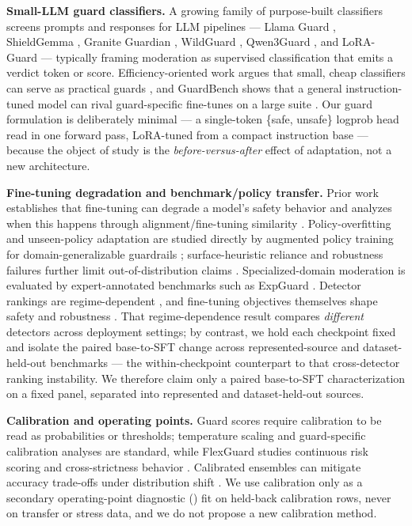 \documentclass[11pt]{article}
\begin{document}
\textbf{Small-LLM guard classifiers.} A growing family of purpose-built classifiers screens prompts and responses for LLM pipelines --- Llama Guard \cite{inan2023llamaguard,meta2024llamaguard3_1b}, ShieldGemma \cite{zeng2024shieldgemma}, Granite Guardian \cite{padhi2024graniteguardian}, WildGuard \cite{han2024wildguard}, Qwen3Guard \cite{qwen3guard2025}, and LoRA-Guard \cite{elesedy2024loraguard} --- typically framing moderation as supervised classification that emits a verdict token or score. Efficiency-oriented work argues that small, cheap classifiers can serve as practical guards \cite{majhi2025gpuguard}, and GuardBench shows that a general instruction-tuned model can rival guard-specific fine-tunes on a large suite \cite{bassani2024guardbench}. Our guard formulation is deliberately minimal --- a single-token \{safe, unsafe\} logprob head read in one forward pass, LoRA-tuned from a compact instruction base \cite{bakouch2025smollm3,hu2021lora} --- because the object of study is the \emph{before-versus-after} effect of adaptation, not a new architecture.

\textbf{Fine-tuning degradation and benchmark/policy transfer.} Prior work establishes that fine-tuning can degrade a model's safety behavior and analyzes when this happens through alignment/fine-tuning similarity \cite{hsiung2025guardrails}. Policy-overfitting and unseen-policy adaptation are studied directly by augmented policy training for domain-generalizable guardrails \cite{liu2026domaingeneralizable}; surface-heuristic reliance and robustness failures further limit out-of-distribution claims \cite{li2026surfaceheuristics,bassani2025robustness}. Specialized-domain moderation is evaluated by expert-annotated benchmarks such as ExpGuard \cite{expguard2026}. Detector rankings are regime-dependent \cite{akinrele2026regime}, and fine-tuning objectives themselves shape safety and robustness \cite{vennemeyer2026objective}. That regime-dependence result compares \emph{different} detectors across deployment settings; by contrast, we hold each checkpoint fixed and isolate the paired base-to-SFT change across represented-source and dataset-held-out benchmarks --- the within-checkpoint counterpart to that cross-detector ranking instability. We therefore claim only a paired base-to-SFT characterization on a fixed panel, separated into represented and dataset-held-out sources.

\textbf{Calibration and operating points.} Guard scores require calibration to be read as probabilities or thresholds; temperature scaling \cite{guo2017calibration} and guard-specific calibration analyses \cite{liu2025calibration} are standard, while FlexGuard studies continuous risk scoring and cross-strictness behavior \cite{flexguard2026}. Calibrated ensembles can mitigate accuracy trade-offs under distribution shift \cite{kumar2022calibrated}. We use calibration only as a secondary operating-point diagnostic () fit on held-back calibration rows, never on transfer or stress data, and we do not propose a new calibration method.
\end{document}
